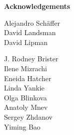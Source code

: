 \documentclass[landscape]{slides}
\begin{document}
\begin{slide}

\large
\begin{center}
\large{\textbf{Acknowledgements}} \\

\vspace{0.5in}

Alejandro Sch\"{a}ffer \\
David Landsman \\
David Lipman

\vspace{0.5in}

J. Rodney Brister \\
Ilene Mizrachi \\
Eneida Hatcher \\
Linda Yankie \\
Olga Blinkova \\
Anatoly Mnev \\
Sergey Zhdanov \\ 
Yiming Bao \\

\end{center}

\vfill
\end{slide}
\end{document}
